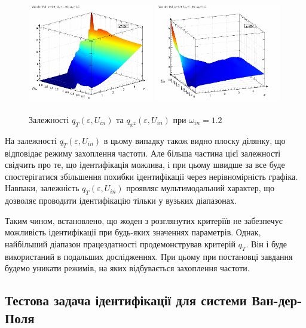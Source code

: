 \begin{figure}[ht!]
\begin{center}
  \includegraphics[width=0.49\textwidth]{p/cha/vdp/vdp_q_2d-p_qT_ome_1x20.png}
  \hfill
  \includegraphics[width=0.49\textwidth]{p/cha/vdp/vdp_q_2d-p_qx2_ome_1x20.png}
\end{center}
  \caption{Залежності $q_T(\varepsilon,U_{in})$ та $q_{x^2}(\varepsilon,U_{in})$  при $\omega_{in}=1.2$}
\label{atu:f:vdp_q2_120}
\end{figure}

На залежності
$ q_T (\varepsilon, U_{in}) $ в цьому випадку також видно плоску ділянку,
що відповідає режиму захоплення частоти. Але більша частина
цієї залежності свідчить про те, що ідентифікація можлива,
і при цьому швидше за все буде спостерігатися збільшення
похибки ідентифікації через нерівномірність графіка. Навпаки,
залежність
$ q_T (\varepsilon, U_{in}) $ проявляє мультимодальний характер, що дозволяє
проводити ідентифікацію тільки у вузьких діапазонах.

Таким чином, встановлено, що жоден з розглянутих критеріїв не
забезпечує можливість ідентифікації при будь-яких значеннях
параметрів. Однак, найбільший діапазон працездатності
продемонстрував критерій
$q_{T}$. Він і буде використаний в подальших дослідженнях. При
цьому при постановці завдання будемо уникати режимів, на яких
відбувається захоплення частоти.


\subsection{Тестова задача ідентифікації для системи Ван-дер-Поля} %

